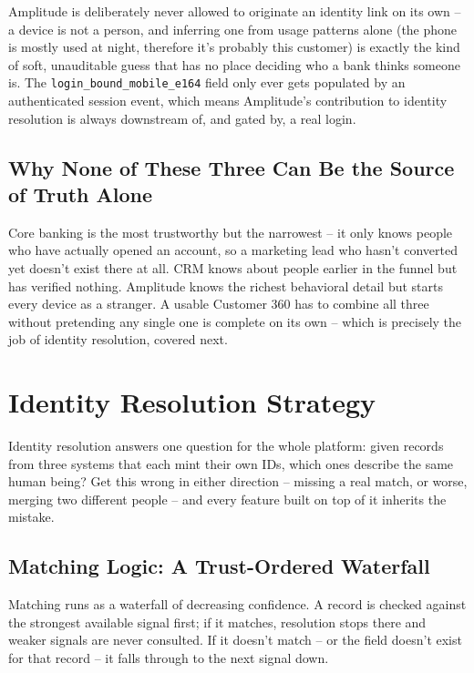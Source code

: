 \documentclass[11pt]{article}
\begin{document}
\begin{rationale}
Amplitude is deliberately never allowed to originate an identity link on its own -- a device is not a person, and inferring one from usage patterns alone (the phone is mostly used at night, therefore it's probably this customer) is exactly the kind of soft, unauditable guess that has no place deciding who a bank thinks someone is. The \texttt{login\_bound\_mobile\_e164} field only ever gets populated by an authenticated session event, which means Amplitude's contribution to identity resolution is always downstream of, and gated by, a real login.
\end{rationale}

\subsection{Why None of These Three Can Be the Source of Truth Alone}
Core banking is the most trustworthy but the narrowest -- it only knows people who have actually opened an account, so a marketing lead who hasn't converted yet doesn't exist there at all. CRM knows about people earlier in the funnel but has verified nothing. Amplitude knows the richest behavioral detail but starts every device as a stranger. A usable Customer 360 has to combine all three without pretending any single one is complete on its own -- which is precisely the job of identity resolution, covered next.

\section{Identity Resolution Strategy}
Identity resolution answers one question for the whole platform: given records from three systems that each mint their own IDs, which ones describe the same human being? Get this wrong in either direction -- missing a real match, or worse, merging two different people -- and every feature built on top of it inherits the mistake.

\subsection{Matching Logic: A Trust-Ordered Waterfall}
Matching runs as a waterfall of decreasing confidence. A record is checked against the strongest available signal first; if it matches, resolution stops there and weaker signals are never consulted. If it doesn't match -- or the field doesn't exist for that record -- it falls through to the next signal down.
\end{document}
